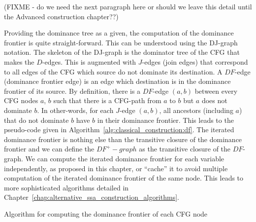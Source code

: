 

(FIXME - do we need the next paragraph here or should we leave this detail until
the Advanced construction chapter??)

Providing the dominance tree as a given, the computation of the dominance frontier is quite straight-forward. This can be understood using the DJ-graph notation. The skeleton of the DJ-graph is the dominator tree of the CFG that makes the $D$-edges. This is augmented with $J$-edges (join edges) that correspond to all edges of the CFG which source do not dominate its destination. A $DF$-edge (dominance frontier edge) is an edge which destination is in the dominance frontier of its source. By definition, there is a $DF$-edge $(a,b)$ between every CFG nodes $a$, $b$ such that there is a CFG-path from $a$ to $b$ but $a$ does not dominate $b$. 
In other-words, for each  $J$-edge $(a,b)$, all ancestors (including $a$) that do not dominate $b$ have $b$ in their dominance frontier. This leads to the pseudo-code given in Algorithm~\ref{alg:classical_construction:df}. The iterated dominance frontier is nothing else than the transitive closure of the dominance frontier and we can define the $DF^+-graph$ as the transitive closure of the $DF$-graph. We can compute the iterated dominance frontier for each variable independently, as proposed in this chapter, or ``cache'' it to avoid multiple computation of the iterated dominance frontier of the same node. This leads to more sophisticated algorithms detailed in Chapter~\ref{chap:alternative_ssa_construction_algorithms}.

\begin{algorithm}
\caption{\label{alg:classical_construction:df}Algorithm for computing the dominance frontier of each CFG node}
\end{algorithm}


